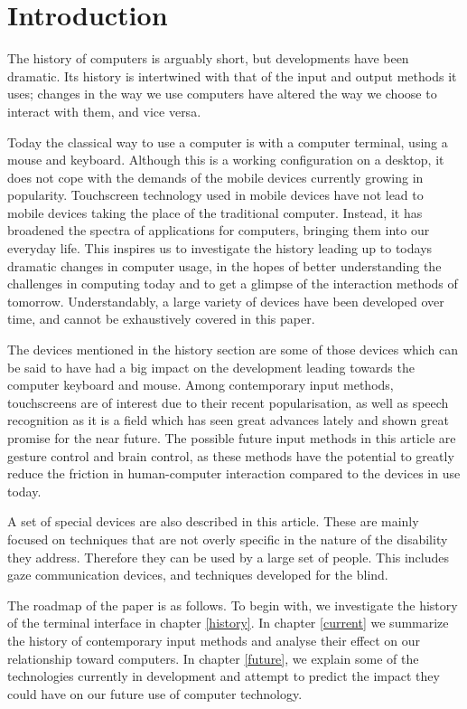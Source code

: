 
\section{Introduction}

The history of computers is arguably short, but developments have been dramatic. Its history is intertwined with that of the input and output methods it uses; changes in the way we use computers have altered the way we choose to interact with them, and vice versa. 

Today the classical way to use a computer is with a computer terminal, using a mouse and keyboard. Although this is a working configuration on a desktop, it does not cope with the demands of the mobile devices currently growing in popularity. Touchscreen technology used in mobile devices have not lead to mobile devices taking the place of the traditional computer. Instead, it has broadened the spectra of applications for computers, bringing them into our everyday life. This inspires us to investigate the history leading up to todays dramatic changes in computer usage, in the hopes of better understanding the challenges in computing today and to get a glimpse of the interaction methods of tomorrow. Understandably, a large variety of devices have been developed over time, and cannot be exhaustively covered in this paper.

The devices mentioned in the history section are some of those devices which can be said to have had a big impact on the development leading towards the computer keyboard and mouse. Among contemporary input methods, touchscreens are of interest due to their recent popularisation, as well as speech recognition as it is a field which has seen great advances lately and shown great promise for the near future. The possible future input methods in this article are gesture control and brain control, as these methods have the potential to greatly reduce the friction in human-computer interaction compared to the devices in use today.

A set of special devices are also described in this article. These are mainly focused on techniques that are not overly specific in the nature of the disability they address. Therefore they can be used by a large set of people. This includes gaze communication devices, and techniques developed for the blind.

The roadmap of the paper is as follows. To begin with, we investigate the history of the terminal interface in chapter \ref{history}. In chapter \ref{current} we summarize the history of contemporary input methods and analyse their effect on our relationship toward computers. In chapter \ref{future}, we explain some of the technologies currently in development and attempt to predict the impact they could have on our future use of computer technology.
